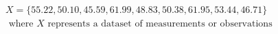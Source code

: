 \begin{tcolorbox}
	$X = \{ 55.22, 50.10, 45.59, 61.99, 48.83, 50.38, 61.95, 53.44, 46.71\}$\\
	$\text{ where } X \text{ represents a dataset of measurements or observations}$
\end{tcolorbox}
